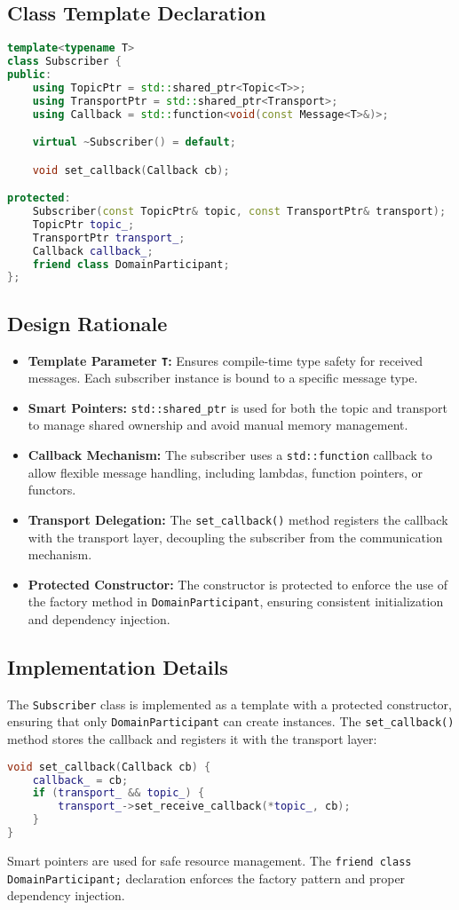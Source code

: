 \documentclass[12pt]{report}
\begin{document}
\subsection{Class Template Declaration}
\begin{lstlisting}[language=C++]
template<typename T>
class Subscriber {
public:
    using TopicPtr = std::shared_ptr<Topic<T>>;
    using TransportPtr = std::shared_ptr<Transport>;
    using Callback = std::function<void(const Message<T>&)>;

    virtual ~Subscriber() = default;

    void set_callback(Callback cb);

protected:
    Subscriber(const TopicPtr& topic, const TransportPtr& transport);
    TopicPtr topic_;
    TransportPtr transport_;
    Callback callback_;
    friend class DomainParticipant;
};
\end{lstlisting}

\subsection{Design Rationale}
\begin{itemize}
    \item \textbf{Template Parameter \texttt{T}:} Ensures compile-time type safety for received messages. Each subscriber instance is bound to a specific message type.
    \item \textbf{Smart Pointers:} \texttt{std::shared\_ptr} is used for both the topic and transport to manage shared ownership and avoid manual memory management.
    \item \textbf{Callback Mechanism:} The subscriber uses a \texttt{std::function} callback to allow flexible message handling, including lambdas, function pointers, or functors.
    \item \textbf{Transport Delegation:} The \texttt{set\_callback()} method registers the callback with the transport layer, decoupling the subscriber from the communication mechanism.
    \item \textbf{Protected Constructor:} The constructor is protected to enforce the use of the factory method in \texttt{DomainParticipant}, ensuring consistent initialization and dependency injection.
\end{itemize}

\subsection{Implementation Details}
The \texttt{Subscriber} class is implemented as a template with a protected constructor, ensuring that only \texttt{DomainParticipant} can create instances. The \texttt{set\_callback()} method stores the callback and registers it with the transport layer:
\begin{lstlisting}[language=C++]
void set_callback(Callback cb) {
    callback_ = cb;
    if (transport_ && topic_) {
        transport_->set_receive_callback(*topic_, cb);
    }
}
\end{lstlisting}
Smart pointers are used for safe resource management. The \texttt{friend class DomainParticipant;} declaration enforces the factory pattern and proper dependency injection.
\end{document}
